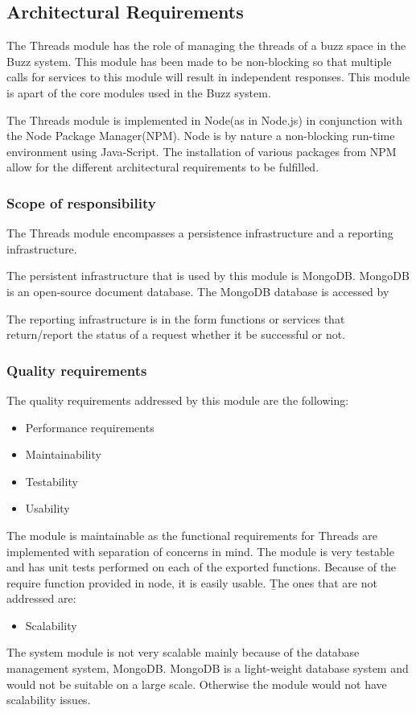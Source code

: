 \subsection{Architectural Requirements}
\begin{flushleft}

The Threads module has the role of managing the threads of a buzz space in the Buzz system. This module has been made to be non-blocking so that multiple calls for services to this module will result in independent responses. This module is apart of the core modules used in the Buzz system.

The Threads module is implemented in Node(as in Node.js) in conjunction with the Node Package Manager(NPM). Node is by nature a non-blocking run-time environment using Java-Script. The installation of various packages from NPM allow for the different architectural requirements to be fulfilled. 

\subsubsection{Scope of responsibility}
The Threads module encompasses a persistence infrastructure and a reporting infrastructure. 

The persistent infrastructure that is used by this module is MongoDB. MongoDB is an open-source document database. The MongoDB database is accessed by

The reporting infrastructure is in the form functions or services that return/report the status of a request whether it be successful or not.

\subsubsection{Quality requirements}
The quality requirements addressed by this module are the following:
\begin{itemize}
\item Performance requirements
\item Maintainability
\item Testability
\item Usability
\end{itemize}
The module is maintainable as the functional requirements for Threads are implemented with separation of concerns in mind. 
The module is very testable and has unit tests performed on each of the exported functions. Because of the require function provided in node, it is easily usable.
\b
The ones that are not addressed are:
\begin{itemize}
\item Scalability
\end{itemize}
The system module is not very scalable mainly because of the database management system, MongoDB. MongoDB is a light-weight database system and would not be suitable on a large scale. Otherwise the module would not have scalability issues.


\end{flushleft}

